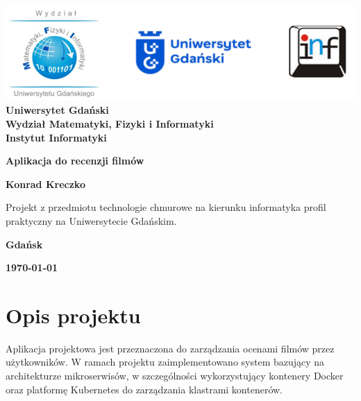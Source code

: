 \documentclass[12pt,a4paper]{article}
\newcommand{\hmwkTitle}{Aplikacja do recenzji filmów} %
\newcommand{\hmwkDueDate}{\today} %
\newcommand{\hmwkAuthorName}{Konrad Kreczko} %
\begin{document}
\begin{titlepage}
    \vfill
	\begin{center}
	\hspace*{-1cm}
	\vspace*{0.5cm}
    \includegraphics[scale=0.55]{imagens/loga.png}\\
	\textbf{Uniwersytet Gdański \\ [0.05cm]Wydział Matematyki, Fizyki i Informatyki \\ [0.05cm] Instytut Informatyki}

	\vspace{0.6cm}
	\vspace{4cm}
	{\huge \textbf{\hmwkTitle}}\vspace{8mm}
	
	{\large \textbf{\hmwkAuthorName}}\\[3cm]
	
	\hspace{.45\textwidth} %
	   \begin{minipage}{.5\textwidth}
	   Projekt z przedmiotu technologie chmurowe na kierunku informatyka profil praktyczny na Uniwersytecie Gdańskim.\\[0.1cm]
	  \end{minipage}
	  \vfill
	
	\textbf{Gdańsk}
	
	\textbf{\hmwkDueDate}
	\end{center}
\end{titlepage}

\newpage
\setcounter{secnumdepth}{5}
\tableofcontents
\newpage

\section{Opis projektu}
\label{sec:Project}

Aplikacja projektowa jest przeznaczona do zarządzania ocenami filmów przez użytkowników. W ramach projektu zaimplementowano system bazujący na architekturze mikroserwisów, w szczególności wykorzystujący kontenery Docker oraz platformę Kubernetes do zarządzania klastrami kontenerów.
\end{document}
